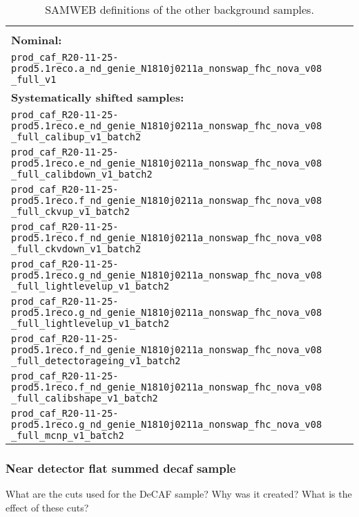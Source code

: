 \begin{table}[!ht]
\centering
\caption{SAMWEB definitions of the other background samples.}
\begin{tabular}{p{\textwidth}}
\hline\hline\\[-2mm]
\textbf{Nominal:}\\
\texttt{prod\_caf\_R20-11-25-prod5.1reco.a\_nd\_genie\_N1810j0211a\_nonswap\_fhc\_nova\_v08} \texttt{\_full\_v1}\\[7mm]
\textbf{Systematically shifted samples:}\\
\texttt{prod\_caf\_R20-11-25-prod5.1reco.e\_nd\_genie\_N1810j0211a\_nonswap\_fhc\_nova\_v08} \texttt{\_full\_calibup\_v1\_batch2}\\[7mm]
\texttt{prod\_caf\_R20-11-25-prod5.1reco.e\_nd\_genie\_N1810j0211a\_nonswap\_fhc\_nova\_v08} \texttt{\_full\_calibdown\_v1\_batch2}\\[7mm]
\texttt{prod\_caf\_R20-11-25-prod5.1reco.f\_nd\_genie\_N1810j0211a\_nonswap\_fhc\_nova\_v08} \texttt{\_full\_ckvup\_v1\_batch2}\\[7mm]
\texttt{prod\_caf\_R20-11-25-prod5.1reco.f\_nd\_genie\_N1810j0211a\_nonswap\_fhc\_nova\_v08} \texttt{\_full\_ckvdown\_v1\_batch2}\\[7mm]
\texttt{prod\_caf\_R20-11-25-prod5.1reco.g\_nd\_genie\_N1810j0211a\_nonswap\_fhc\_nova\_v08} \texttt{\_full\_lightlevelup\_v1\_batch2}\\[7mm]
\texttt{prod\_caf\_R20-11-25-prod5.1reco.g\_nd\_genie\_N1810j0211a\_nonswap\_fhc\_nova\_v08} \texttt{\_full\_lightlevelup\_v1\_batch2}\\[7mm]
\texttt{prod\_caf\_R20-11-25-prod5.1reco.f\_nd\_genie\_N1810j0211a\_nonswap\_fhc\_nova\_v08} \texttt{\_full\_detectorageing\_v1\_batch2}\\[7mm]
\texttt{prod\_caf\_R20-11-25-prod5.1reco.f\_nd\_genie\_N1810j0211a\_nonswap\_fhc\_nova\_v08} \texttt{\_full\_calibshape\_v1\_batch2}\\[7mm]
\texttt{prod\_caf\_R20-11-25-prod5.1reco.g\_nd\_genie\_N1810j0211a\_nonswap\_fhc\_nova\_v08} \texttt{\_full\_mcnp\_v1\_batch2}\\[7mm]
\hline\hline
\end{tabular}
\label{tab:CAFDefinitions}
\end{table}

\iffalse
\subsubsection*{Near detector flat summed decaf sample}
What are the cuts used for the DeCAF sample? Why was it created? What is the effect of these cuts?

